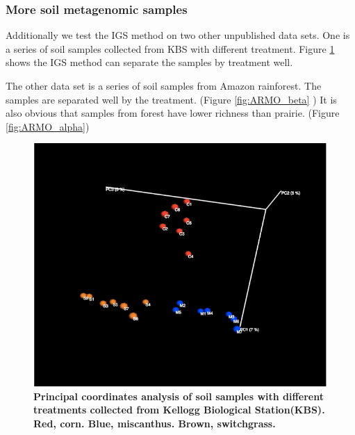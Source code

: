 \documentclass{article}
\begin{document}



\subsubsection{More soil metagenomic samples}

Additionally we test the IGS method on two other unpublished data sets. 
One is a series of soil samples
collected from KBS with different treatment. Figure \ref{fig:KBS_beta}
shows the IGS method can separate
the samples by treatment well. 

The other data set is a series of soil samples from Amazon rainforest. 
The samples are separated well
by the treatment. (Figure \ref{fig:ARMO_beta} ) It is also obvious 
that samples from forest have 
lower richness than prairie. (Figure \ref{fig:ARMO_alpha})




\begin{figure}[!ht]
 \centerline{\includegraphics[width=6in]{./figures/IGS_KBS_beta.png}}
\caption{\bf Principal coordinates analysis of soil samples with different
treatments collected from Kellogg Biological Station(KBS). Red, corn. Blue,
miscanthus. Brown, switchgrass.}
\label{fig:KBS_beta}
\end{figure}
\end{document}

